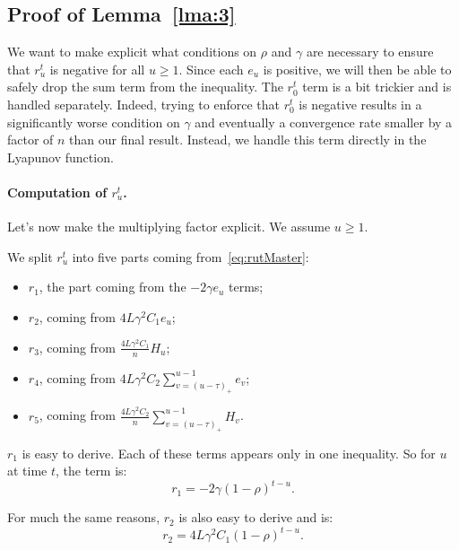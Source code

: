 \documentclass[twoside]{article}
\newcommand{\stepsize}{\gamma}
\newcommand{\overlap}{\tau}
\newcommand{\contraction}{\rho}
\newcommand{\lipschitz}{L}
\begin{document}
\subsection{Proof of Lemma~\ref{lma:3}}\label{apxB:lma3}
We want to make explicit what conditions on $\contraction$ and $\stepsize$ are necessary to ensure that $r_u^t$ is negative for all $u \geq 1$. 
Since each $e_u$ is positive, we will then be able to safely drop the sum term from the inequality. 
The $r_0^t$ term is a bit trickier and is handled separately. 
Indeed, trying to enforce that $r_0^t$ is negative results in a significantly worse condition on $\stepsize$ and eventually a convergence rate smaller by a factor of $n$ than our final result.
Instead, we handle this term directly in the Lyapunov function.

\paragraph{Computation of $r_u^t$.}
Let's now make the multiplying factor explicit. 
We assume $u \geq 1$.

We split $r_u^t$ into five parts coming from~\eqref{eq:rutMaster}: 
\begin{itemize}
\item $r_1$, the part coming from the $-2\stepsize e_u$ terms;
\item $r_2$, coming from $4\lipschitz\stepsize^2 C_1 e_u$;
\item $r_3$, coming from $\frac{4\lipschitz\stepsize^2 C_1}{n} H_u$;
\item $r_4$, coming from $4\lipschitz\stepsize^2 C_2\sum_{v=(u-\overlap)_+}^{u-1} e_v$;
\item $r_5$, coming from $\frac{4\lipschitz\stepsize^2 C_2}{n} \sum_{v=(u-\overlap)_+}^{u-1} H_v$.
\end{itemize}

$r_1$ is easy to derive. Each of these terms appears only in one inequality. 
So for $u$ at time $t$, the term is:
\begin{equation}\label{eq:r1}
r_1 = -2 \stepsize (1- \contraction)^{t-u} .
\end{equation}

For much the same reasons, $r_2$ is also easy to derive and is: 
\begin{equation}\label{eq:r2}
r_2 = 4\lipschitz\stepsize^2 C_1(1- \contraction)^{t-u} .
\end{equation}
\end{document}
